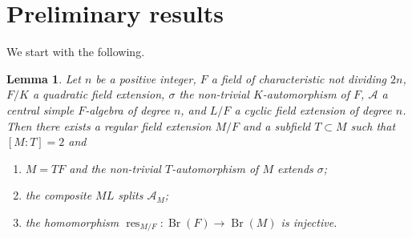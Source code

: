 \documentclass[10pt]{article}
\newtheorem{lemma}[theorem]{Lemma}
\theoremstyle{definition}
\DeclareMathOperator{\Br}{Br}
\DeclareMathOperator{\res}{res}
\newcommand{\A}{\mathcal A}
\begin{document}
\section{Preliminary results}
We start with the following.
\begin{lemma}\label{lem-transfer}
Let $n$ be a positive integer, $F$ a field of characteristic not dividing $2n$, $F/K$ a quadratic field extension, $\sigma$ the non-trivial $K$-automorphism of $F$, $\A$ a central simple $F$-algebra of degree $n$, and $L/F$ a cyclic field extension of degree $n$. Then there exists a regular field extension $M/F$ and a subfield $T\subset M$ such that $[M:T]=2$ and
\begin{enumerate}
\item $M=TF$ and the non-trivial $T$-automorphism of $M$ extends $\sigma$;
\item the composite $ML$ splits $\A_M$;
\item the homomorphism $\res_{M/F}:\Br(F)\to\Br(M)$ is injective.
\end{enumerate}
\end{lemma}
\end{document}
